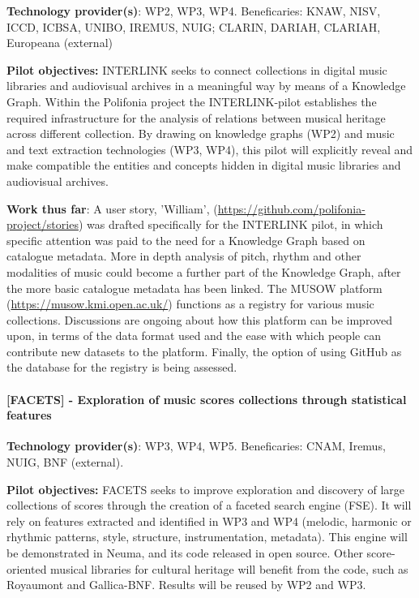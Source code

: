 \textbf{Technology provider(s)}: WP2, WP3, WP4. 
Beneficaries: KNAW, NISV, ICCD, ICBSA, UNIBO, 
IREMUS, NUIG; CLARIN, DARIAH, CLARIAH, Europeana (external)

\textbf{Pilot objectives:} INTERLINK seeks to connect collections in digital music libraries and audiovisual archives in a meaningful way by means of a Knowledge Graph. Within the Polifonia project the INTERLINK-pilot establishes the required infrastructure for the analysis of relations between musical heritage across different collection. By drawing on knowledge graphs (WP2) and music and text extraction technologies (WP3, WP4), this pilot will explicitly reveal and make compatible the entities and concepts hidden in digital music libraries and audiovisual archives.

\textbf{Work thus far}: 
A user story, 'William', (\url {https://github.com/polifonia-project/stories}) was drafted specifically for the INTERLINK pilot, in which specific attention was paid to the need for a Knowledge Graph based on catalogue metadata. More in depth analysis of pitch, rhythm and other modalities of music could become a further part of the Knowledge Graph, after the more basic catalogue metadata has been linked. 
The MUSOW platform (\url {https://musow.kmi.open.ac.uk/}) functions as a registry for various music collections. Discussions are ongoing about how this platform can be improved upon, in terms of the data format used and the ease with which people can contribute new datasets to the platform.
Finally, the option of using GitHub as the database for the registry is being assessed.

\paragraph*{[FACETS] - Exploration of music scores collections through statistical features}\label{sec:pilot:facets}

\textbf{Technology provider(s)}: WP3, WP4, WP5.
Beneficaries: CNAM, Iremus, NUIG, BNF (external).

\textbf{Pilot objectives:} FACETS seeks to improve exploration and discovery of large collections of scores through the creation of a faceted search engine (FSE). It will rely on features extracted and identified in WP3 and WP4 (melodic, harmonic or rhythmic patterns, style, structure, instrumentation, metadata). This engine will be demonstrated in Neuma, and its code released in open source. Other score-oriented musical libraries for cultural heritage will benefit from the code, such as Royaumont and Gallica-BNF. Results will be reused by WP2 and WP3.

